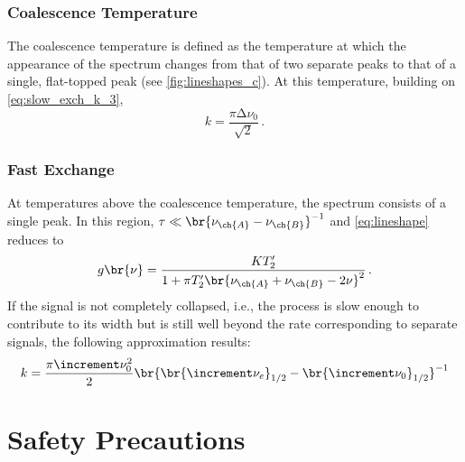 \documentclass[nobib,nofonts,nols,nohyper]{tufte-handout}
\begin{document}

\subsubsection{Coalescence Temperature} %
\label{ssub:coalescence_temperature}

The coalescence temperature is defined as the temperature at which the appearance of the spectrum changes from that of two separate peaks to that of a single, flat-topped peak (see \cref{fig:lineshapes_c}). 
At this temperature, building on \cref{eq:slow_exch_k_3}, 
\begin{equation}
  k = \frac{\pi \increment \nu_0}{\sqrt{2}} \, .
  \label{eq:intermed_exch_k}
\end{equation}


\subsubsection{Fast Exchange} %
\label{ssub:fast_exchange}

At temperatures above the coalescence temperature, the spectrum consists of a single peak. 
In this region, \( \tau \ll \br{\nu_{\ch{A}} - \nu_{\ch{B}}}^{-1} \) and \cref{eq:lineshape} reduces to
\begin{equation}
  g\br{\nu} = \frac{K T'_2}{1 + \pi T'_2 \br{\nu_{\ch{A}} + \nu_{\ch{B}} - 2 \nu}^2} \, .
  \label{eq:fast_exch_lineshape}
\end{equation}
If the signal is not completely collapsed, i.e., the process is slow enough to contribute to its width but is still well beyond the rate corresponding to separate signals, the following approximation results:
\begin{equation}
  k = \frac{\pi \increment \nu_0^2}{2} \br{\br{\increment \nu_e}_{1/2} - \br{\increment \nu_0}_{1/2}}^{-1}
  \label{eq:fast_exch_k}
\end{equation}


\pagebreak

\section{Safety Precautions} %
\label{sec:safety}
\end{document}
